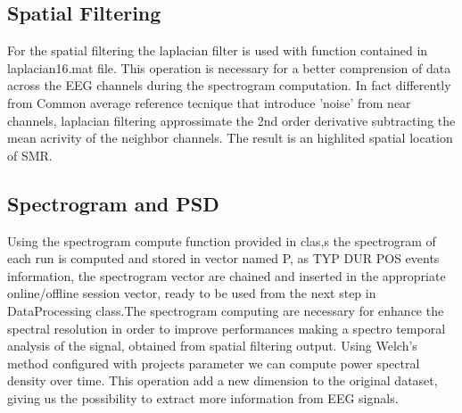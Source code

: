 \subsection{Spatial Filtering}\label{subsec:spatial}
For the spatial filtering the laplacian filter is used with function contained in laplacian16.mat file. This operation is necessary for a better comprension of data across the EEG channels during the spectrogram computation. In fact differently from Common average reference tecnique that introduce 'noise' from near channels, laplacian filtering approssimate the 2nd order derivative subtracting the mean acrivity of the neighbor channels. The result is an highlited spatial location of SMR.   
\subsection{Spectrogram and PSD}\label{subsec:psd}
Using the spectrogram compute function provided in clas,s the spectrogram of each run is computed and stored in vector named P, as TYP DUR POS events information, the spectrogram vector are chained and inserted in the appropriate online/offline session vector, ready to be used from the next step in DataProcessing class.The spectrogram computing are necessary for enhance the spectral resolution in order to improve performances making a spectro temporal analysis of the signal, obtained from spatial filtering output. Using Welch's method configured with projects parameter we can compute power spectral density over time. This operation add a new dimension to the original dataset, giving us the possibility to extract more information from EEG signals.
